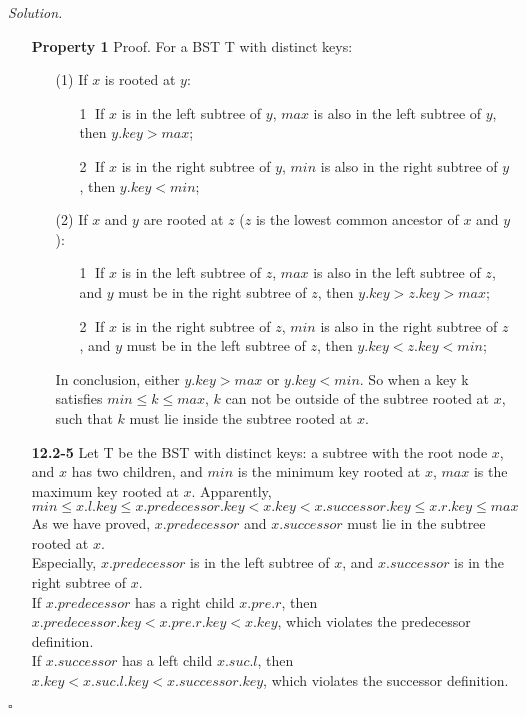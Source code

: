 \documentclass[11pt]{article}
\theoremstyle{definition}
\newenvironment{solution}{\noindent\emph{Solution.}}{\hfill$\square$}
\newcommand\tab[1][1cm]{\hspace*{#1}}
\begin{document}
\begin{solution}
\begin{enumerate}
    \item[\textbf{Property 1}]
    \tab Proof. For a BST T with distinct keys:
    \begin{enumerate}
    \item[(1)] 
    If $x$ is rooted at $y$:
    \begin{enumerate}
    \item[\textcircled{1}]If $x$ is in the left subtree of $y$, $max$ is also in the left subtree of $y$, then $y.key > max$;
    \item[\textcircled{2}]If $x$ is in the right subtree of $y$, $min$ is also in the right subtree of $y$, then $y.key < min$;
    \end{enumerate}
    \item[(2)] 
    If $x$ and $y$ are rooted at $z$ ($z$ is the lowest common ancestor of $x$ and $y$):
    \begin{enumerate}
    \item[\textcircled{1}]If $x$ is in the left subtree of $z$, $max$ is also in the left subtree of $z$, and $y$ must be in the right subtree of $z$, then $y.key > z.key > max$;
    \item[\textcircled{2}]If $x$ is in the right subtree of $z$, $min$ is also in the right subtree of $z$, and $y$ must be in the left subtree of $z$, then $y.key < z.key < min$;
    \end{enumerate}
    In conclusion, either $y.key > max$ or $y.key < min$.
    So when a key k satisfies $min \leq k \leq max$, $k$ can not be outside of the subtree rooted at $x$, such that $k$ must lie inside the subtree rooted at $x$.
    \end{enumerate}
    
    \item[\textbf{12.2-5}]
    \tab Let T be the BST with distinct keys: a subtree with the root node $x$, and $x$ has two children, and $min$ is the minimum key rooted at $x$, $max$ is the maximum key rooted at $x$. Apparently,
    $$min \leq x.l.key \leq x.predecessor.key < x.key < x.successor.key \leq x.r.key \leq max$$
    \tab As we have proved, $x.predecessor$ and $x.successor$ must lie in the subtree rooted at $x$.\\
    \tab Especially, $x.predecessor$ is in the left subtree of $x$, and $x.successor$ is in the right subtree of $x$. \\
    \tab If $x.predecessor$ has a right child $x.pre.r$, then $x.predecessor.key < x.pre.r.key < x.key$, which violates the predecessor definition. \\
    \tab If $x.successor$ has a left child $x.suc.l$, then $x.key < x.suc.l.key < x.successor.key$, which violates the successor definition. \\
    

\end{enumerate}
\end{solution}
\end{document}
